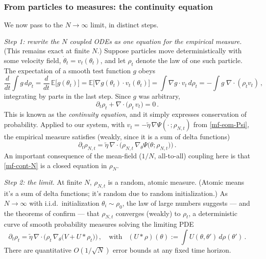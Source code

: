 \documentclass[11pt]{article}
\newcommand{\E}{\mathbb{E}}
\newcommand{\pd}{\partial}
\begin{document}
\subsubsection{From particles to measures: the continuity equation}

We now pass to the $N\to\infty$ limit, in distinct steps. 

\emph{Step 1: rewrite the $N$ coupled ODEs as one equation for the empirical measure.} (This remains exact at finite $N$.) Suppose particles move deterministically with some velocity field, $\dot\theta_t = v_t(\theta_t)$, and let $\rho_t$ denote the law of one such particle.
The expectation of a smooth test function $g$ obeys
%
\begin{equation}
    \frac{d}{dt}\int g\,d\rho_t = \frac{d}{dt}\,\E\big[g(\theta_t)\big] = \E\big[\nabla g(\theta_t)\cdot v_t(\theta_t)\big] = \int \nabla g\cdot v_t\, d\rho_t = -\int g\;\nabla\!\cdot\!(\rho_t v_t)\,,
\end{equation}
%
integrating by parts in the last step. Since $g$ was arbitrary,
%
\begin{equation} \label{mf-cont}
    \pd_t\rho_t + \nabla\!\cdot\!\big(\rho_t\, v_t\big) = 0\,.
\end{equation}
%
This is known as the \emph{continuity equation}, and it simply expresses conservation of probability. Applied to our system, with $v_t = -\tilde\eta\,\nabla\Psi(\cdot\,;\rho_{N,t})$ from \eqref{mf-eom-Psi}, the empirical measure satisfies (weakly, since it is a sum of delta functions)
%
\begin{equation} \label{mf-cont-N}
    \pd_t \rho_{N,t} = \tilde\eta\,\nabla\!\cdot\!\Big(\rho_{N,t}\,\nabla_\theta \Psi\big(\theta;\rho_{N,t}\big)\Big)\,.
\end{equation}
%
An important consequence of the mean-field ($1/N$, all-to-all) coupling here is that \eqref{mf-cont-N} is a closed equation in $\rho_N$. 

\emph{Step 2: the limit.} At finite $N$, $\rho_{N,t}$ is a random, atomic measure. (Atomic means it's a sum of delta functions; it's random due to random initialization.)  As $N\to\infty$ with i.i.d.\ initialization $\theta_i\sim\rho_0$, the law of large numbers suggests --- and the theorems of \cite{mei2018mean,chizat2018global,rotskoff2022trainability,sirignano2020mean} confirm --- that $\rho_{N,t}$ converges (weakly) to $\rho_t$, a deterministic curve of smooth probability measures solving the limiting PDE
%
\begin{equation} \label{mf-pde}
    \pd_t\rho_t = \tilde\eta\, \nabla\!\cdot\!\Big(\rho_t\,\nabla_\theta\big(V + U*\rho_t\big)\Big)\,,\quad \text{with}\;\;\; (U*\rho)(\theta):=\int U(\theta,\theta')\,d\rho(\theta')\,.
\end{equation}
%
There are quantitative $O(1/\sqrt N)$ error bounds at any fixed time horizon. %
\end{document}

